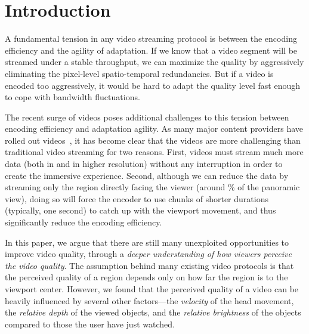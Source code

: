 
\section{Introduction}


A fundamental tension in any video streaming protocol is between the encoding efficiency and the agility of adaptation.
If we know that a video segment will be streamed under a stable throughput, we can maximize the quality by aggressively eliminating the pixel-level spatio-temporal redundancies.
But if a video is encoded too aggressively, it would be hard to adapt the quality level fast enough to cope with bandwidth fluctuations.


The recent surge of \vr videos poses additional challenges to this tension between encoding efficiency and adaptation agility. 
As many major content providers have rolled out \vr videos~\cite{??,??,??,??,??}, 
it has become clear that the \vr videos are more challenging than traditional video streaming for two reasons.
First, \vr videos must stream much more data (both in \vr and in higher resolution) without any interruption in order to create the immersive experience.
Second, although we can reduce the data by streaming only the region directly facing the viewer (around \fillme\% of the panoramic view), doing so will force the encoder to use chunks of shorter durations (typically, one second) to catch up with the viewport movement, and thus significantly reduce the encoding efficiency.


In this paper, we argue that there are still many unexploited opportunities to improve \vr video quality, through a {\em deeper understanding of how viewers perceive the \vr video quality}.
The assumption behind many existing \vr video protocols is that the perceived quality of a region depends only on how far the region is to the viewport center.
However, we found that the perceived quality of a \vr video can be heavily influenced by several other factors---the {\em velocity} of the head movement, the {\em relative depth} of the viewed objects, and the {\em relative brightness} of the objects compared to those the user have just watched. 

